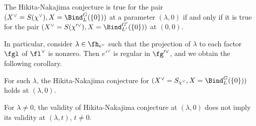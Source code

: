 \documentclass[12pt]{amsart}
\begin{document}
\begin{prop} \label{reduce_to_0}
    The Hikita-Nakajima conjecture is true for the pair $(X^\vee= S({\chi^\vee}), X= \Bind_{L}^{G}(\{0\}))$ at a parameter $(\lambda, 0)$ if and only if it is true for the pair $(X^\vee= S{(\chi'^\vee)}, X= \Bind_{L'}^{G'}(\{0\}))$ at $(0,0)$.
\end{prop}
In particular, consider $\lambda\in \fh_{e^{\vee}}$ such that the projection of $\lambda$ to each factor $\fgl$ of $\fl^\vee$ is nonzero. Then $e'^\vee$ is regular in $\fg'^{\vee}$, and we obtain the following corollary. 
\begin{cor}
    For such $\lambda$, the Hikita-Nakajima conjecture for $(X^\vee= S_{\chi^\vee}, X= \Bind_{L}^{G}(\{0\}))$ holds at $(\lambda, 0)$. 
\end{cor}
\begin{rmk}
    For $\lambda\neq 0$, the validity of Hikita-Nakajima conjecture at $(\lambda, 0)$ does not imply its validity at $(\lambda, t)$, $t\neq 0$.
\end{rmk}
\end{document}
